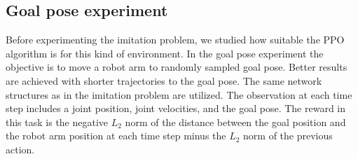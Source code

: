 \subsection{Goal pose experiment}

Before experimenting the imitation problem, we studied how suitable the PPO algorithm is for this kind of environment. In the goal pose experiment the objective is to move a robot arm to randomly sampled goal pose. Better results are achieved with shorter trajectories to the goal pose. The same network structures as in the imitation problem are utilized. The observation at each time step includes a joint position, joint velocities, and the goal pose. The reward in this task is the negative $L_2$ norm of the distance between the goal position and the robot arm position at each time step minus the $L_2$ norm of the previous action.
